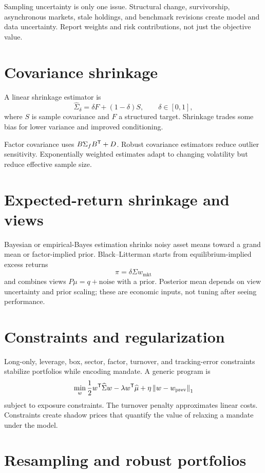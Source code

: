 Sampling uncertainty is only one issue. Structural change, survivorship,
asynchronous markets, stale holdings, and benchmark revisions create model and data
uncertainty. Report weights and risk contributions, not just the objective value.

\section{Covariance shrinkage}

A linear shrinkage estimator is
\[
\widehat\Sigma_\delta=
\delta F+(1-\delta)S,\qquad \delta\in[0,1],
\]
where $S$ is sample covariance and $F$ a structured target. Shrinkage trades some
bias for lower variance and improved conditioning.

Factor covariance uses
$B\Sigma_fB^\mathsf T+D$. Robust covariance estimators reduce outlier sensitivity.
Exponentially weighted estimates adapt to changing volatility but reduce effective
sample size.

\section{Expected-return shrinkage and views}

Bayesian or empirical-Bayes estimation shrinks noisy asset means toward a grand mean
or factor-implied prior. Black--Litterman starts from equilibrium-implied excess
returns
\[
\pi=\delta\Sigma w_{\mathrm{mkt}}
\]
and combines views $P\mu=q+\text{noise}$ with a prior. Posterior mean depends on view
uncertainty and prior scaling; these are economic inputs, not tuning after seeing
performance.

\section{Constraints and regularization}

Long-only, leverage, box, sector, factor, turnover, and tracking-error constraints
stabilize portfolios while encoding mandate. A generic program is
\[
\min_w\frac12w^\mathsf T\widehat\Sigma w
-\lambda w^\mathsf T\widehat\mu
+\eta\left\lVert w-w_{\mathrm{prev}}\right\rVert_1
\]
subject to exposure constraints. The turnover penalty approximates linear costs.
Constraints create shadow prices that quantify the value of relaxing a mandate under
the model.

\section{Resampling and robust portfolios}

